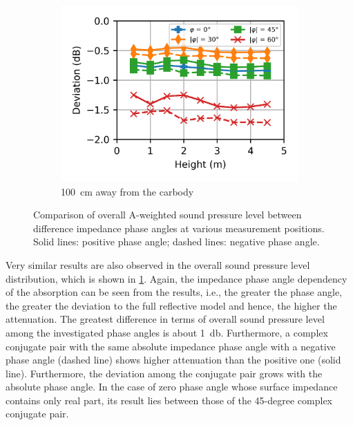 \begin{figure}
\begin{subfigure}[b]{\textwidth}
		\includegraphics{fig/chap5/impedance/overall_SPL/deviation_pos_g.png}
		\caption{\SI{100}{\centi\meter} away from the carbody}
	\end{subfigure}
	
	\caption{Comparison of overall A-weighted sound pressure level between difference impedance phase angles at various measurement positions. Solid lines: positive phase angle; dashed lines: negative phase angle.}
	\label{fig:overall_SPL_impedance}
\end{figure}

Very similar results are also observed in the overall sound pressure level distribution, which is shown in \cref{fig:overall_SPL_impedance}. Again, the impedance phase angle dependency of the absorption can be seen from the results, i.e., the greater the phase angle, the greater the deviation to the full reflective model and hence, the higher the attenuation. The greatest difference in terms of overall sound pressure level among the investigated phase angles is about \SI{1}{\decibel}. Furthermore, a complex conjugate pair with the same absolute impedance phase angle with a negative phase angle (dashed line) shows higher attenuation than the positive one (solid line). Furthermore, the deviation among the conjugate pair grows with the absolute phase angle. In the case of zero phase angle whose surface impedance contains only real part, its result lies between those of the 45-degree complex conjugate pair.

